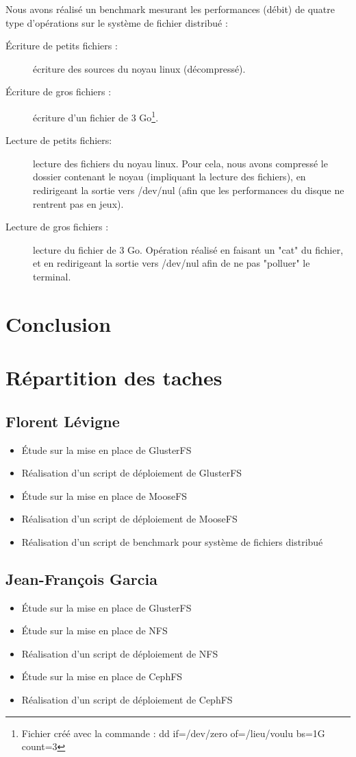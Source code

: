 \documentclass[12pt]{report}
\begin{document}
			Nous avons réalisé un benchmark mesurant les performances (débit) de quatre type d'opérations sur le système de fichier distribué :
			\begin{description}
				\item[Écriture de petits fichiers :] écriture des sources du noyau linux (décompressé).
				\item[Écriture de gros fichiers :] écriture d'un fichier de 3 Go\footnote{Fichier créé avec la commande : dd if=/dev/zero of=/lieu/voulu bs=1G count=3}.
				\item[Lecture de petits fichiers: ] lecture des fichiers du noyau linux.
				Pour cela, nous avons compressé le dossier contenant le noyau (impliquant la lecture des fichiers),
				en redirigeant la sortie vers /dev/nul (afin que les performances du disque ne rentrent pas en jeux).
				\item[Lecture de gros fichiers :] lecture du fichier de 3 Go. Opération réalisé en faisant un "cat" du fichier,
				et en redirigeant la sortie vers /dev/nul afin de ne pas "polluer" le terminal.
			\end{description}


	\chapter{Conclusion}

	\appendix
		\chapter{Répartition des taches}
			\section{Florent Lévigne}
				\begin{itemize}
					\item Étude sur la mise en place de GlusterFS
					\item Réalisation d'un script de déploiement de GlusterFS
					\item Étude sur la mise en place de MooseFS
					\item Réalisation d'un script de déploiement de MooseFS
					\item Réalisation d'un script de benchmark pour système de fichiers distribué
				\end{itemize}
			\section{Jean-François Garcia}
				\begin{itemize}
					\item Étude sur la mise en place de GlusterFS
					\item Étude sur la mise en place de NFS
					\item Réalisation d'un script de déploiement de NFS
					\item Étude sur la mise en place de CephFS
					\item Réalisation d'un script de déploiement de CephFS
				\end{itemize}
\end{document}
